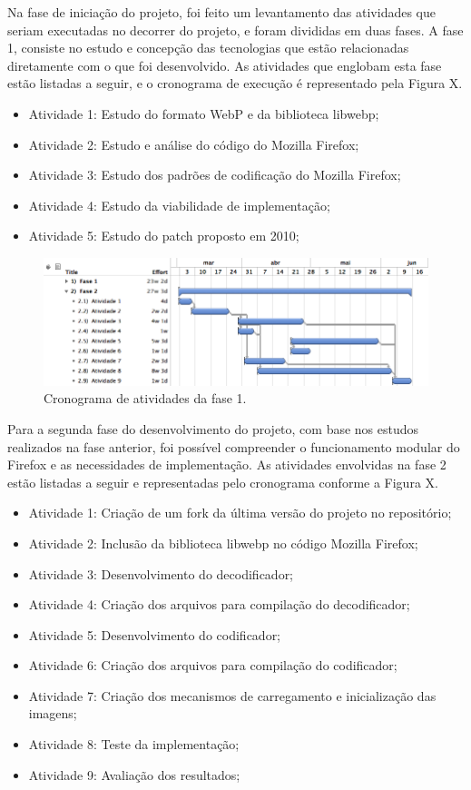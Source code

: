 \documentclass[espaco=simples,appendix=Name]{abnt}
\begin{document}
Na fase de iniciação do projeto, foi feito um levantamento das atividades que seriam executadas no decorrer do projeto, e foram divididas em duas fases. A fase 1, consiste no estudo e concepção das tecnologias que estão relacionadas diretamente com o que foi desenvolvido. As atividades que englobam esta fase estão listadas a seguir, e o cronograma de execução é representado pela Figura X.

\begin{itemize}
	\item Atividade 1: Estudo do formato WebP e da biblioteca libwebp;
	\item Atividade 2: Estudo e análise do código do Mozilla Firefox;
	\item Atividade 3: Estudo dos padrões de codificação do Mozilla Firefox;
	\item Atividade 4: Estudo da viabilidade de implementação;
	\item Atividade 5: Estudo do patch proposto em 2010;
\end{itemize}	

\begin{figure}[h]
  \centering
    \includegraphics[scale=0.4]{fase1.png}
  \caption{Cronograma de atividades da fase 1.}
\end{figure}

Para a segunda fase do desenvolvimento do projeto, com base nos estudos realizados na fase anterior, foi possível compreender o funcionamento modular do Firefox e as necessidades de implementação. As atividades envolvidas na fase 2 estão listadas a seguir e representadas pelo cronograma conforme a Figura X.

\begin{itemize}
	\item Atividade 1: Criação de um fork da última versão do projeto no repositório;
	\item Atividade 2: Inclusão da biblioteca libwebp no código Mozilla Firefox;
	\item Atividade 3: Desenvolvimento do decodificador;
	\item Atividade 4: Criação dos arquivos para compilação do decodificador;
	\item Atividade 5: Desenvolvimento do codificador;
	\item Atividade 6: Criação dos arquivos para compilação do codificador;
	\item Atividade 7: Criação dos mecanismos de carregamento e inicialização das imagens;
	\item Atividade 8: Teste da implementação;
	\item Atividade 9: Avaliação dos resultados;
\end{itemize}	
\end{document}
